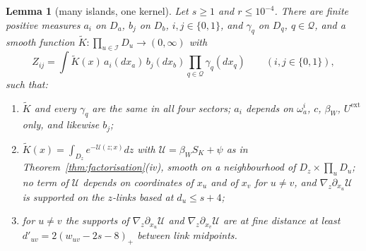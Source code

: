 \documentclass[11pt]{amsart}
\newtheorem{lemma}[theorem]{Lemma}
\theoremstyle{definition}
\theoremstyle{remark}
\numberwithin{equation}{section}
\begin{document}
\begin{lemma}[many islands, one kernel]\label{lem:manykernel}
Let $s\ge1$ and $r\le10^{-4}$. There are finite positive measures $a_i$ on
$D_a$, $b_j$ on $D_b$, $i,j\in\{0,1\}$, and $\gamma_q$ on $D_q$,
$q\in\mathcal Q$, and a smooth function $\tilde K:\prod_{u\in\mathcal I}D_u
\to(0,\infty)$ with
\[
Z_{ij}=\int\tilde K(x)\,a_i(dx_a)\,b_j(dx_b)\prod_{q\in\mathcal Q}
\gamma_q(dx_q)\qquad(i,j\in\{0,1\}),
\]
such that:
\begin{enumerate}[label=\textup{(\roman*)},leftmargin=*]
\item $\tilde K$ and every $\gamma_q$ are the same in all four sectors;
$a_i$ depends on $\omega_a^i$, $c$, $\beta_W$, $U^{\mathrm{ext}}$ only, and
likewise $b_j$;
\item $\tilde K(x)=\int_{D_z}e^{-\mathcal U(z;x)}dz$ with $\mathcal U=
\beta_WS_K+\psi$ as in Theorem~\ref{thm:factorisation}(iv), smooth on a
neighbourhood of $D_z\times\prod_uD_u$; no term of $\mathcal U$ depends on
coordinates of $x_u$ and of $x_v$ for $u\ne v$, and $\nabla_z\partial_{x_u}
\mathcal U$ is supported on the $z$-links based at $d_u\le s+4$;
\item for $u\ne v$ the supports of $\nabla_z\partial_{x_u}\mathcal U$ and
$\nabla_z\partial_{x_v}\mathcal U$ are at fine distance at least
$d'_{uv}=2(w_{uv}-2s-8)_+$ between link midpoints.
\end{enumerate}
\end{lemma}
\end{document}
